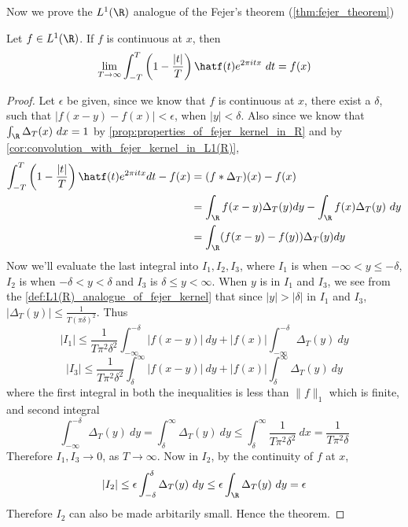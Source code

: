 Now we prove the $L^1(\R)$ analogue of the Fejer's theorem (\autoref{thm:fejer_theorem})
\begin{theorem}
  \label{thm:L1(R)_analogue_of_fejer_theorem}
  Let $f \in L^1(\R)$. If $f$ is continuous at $x$, then $$\lim_{T \to \infty} \int_{-T}^{T}\left(1-\frac{|t|}{T}\right)\hatf(t)e^{2\pi itx} \ dt = f(x)$$
\end{theorem}
\begin{proof}
  Let $\epsilon$ be given, since we know that $f$ is continuous at $x$, there exist a $\delta$, such that $|f(x-y) - f(x)| < \epsilon$, when $|y| < \delta$. Also since we know that $\int_\R \Delta_T(x) \ dx = 1$ by \autoref{prop:properties_of_fejer_kernel_in_R} and by \autoref{cor:convolution_with_fejer_kernel_in_L1(R)},
  \begin{align*}
    \int_{-T}^T\left(1-\frac{|t|}{T}\right)\hatf(t)e^{2\pi itx} dt - f(x) &= (f*\Delta_T)(x) - f(x) \\
     &= \int_\R f(x-y) \Delta_T(y) dy - \int_\R f(x)\Delta_T(y) \ dy \\
     &= \int_\R (f(x-y) - f(y)) \Delta_T(y) dy \\ 
  \end{align*}
  Now we'll evaluate the last integral into $I_1, I_2, I_3$, where $I_1$ is when $-\infty<y\le-\delta$, $I_2$ is when $-\delta < y < \delta$ and $I_3$ is $\delta \le y < \infty$. When $y$ is in $I_1$ and $I_3$, we see from the \autoref{def:L1(R)_analogue_of_fejer_kernel} that since $|y| > |\delta|$ in $I_1$ and $I_3$, $|\Delta_T(y)| \le \frac{1}{T(\pi\delta)^2}$. Thus $$|I_1| \le \frac{1}{T\pi^2\delta^2}\int_{-\infty}^{-\delta} |f(x-y)| \ dy + |f(x)|\int_{-\infty}^{-\delta}\Delta_T(y) \ dy $$ $$|I_3| \le \frac{1}{T\pi^2\delta^2}\int^{\infty}_{\delta} |f(x-y)| \ dy + |f(x)|\int^{\infty}_{\delta}\Delta_T(y) \ dy $$
  where the first integral in both the inequalities is less than $\|f\|_1$ which is finite, and second integral $$\int_{-\infty}^{-\delta} \Delta_T(y) \ dy = \int_\delta^\infty \Delta_T(y) \ dy \le \int_\delta^\infty \frac{1}{T\pi^2 \delta^2} \ dx = \frac{1}{T\pi^2 \delta}$$
  Therefore $I_1, I_3 \to 0$, as $T\to \infty$. Now in $I_2$, by the continuity of $f$ at $x$, $$|I_2| \le \epsilon\int_{-\delta}^\delta \Delta_T(y) \ dy \le \epsilon \int_\R \Delta_T(y) \ dy = \epsilon$$
  Therefore $I_2$ can also be made arbitarily small. Hence the theorem. 
\end{proof}

